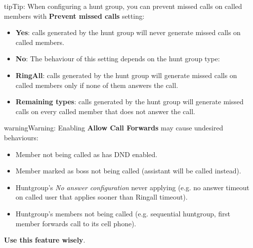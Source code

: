 \documentclass[letterpaper,10pt,english]{sphinxmanual}
\begin{document}
\begin{notice}{tip}{Tip:}
When configuring a hunt group, you can prevent missed calls on called members with \textbf{Prevent missed calls} setting:
\begin{itemize}
\item {} 
\textbf{Yes}: calls generated by the hunt group will never generate missed calls on called members.

\item {} 
\textbf{No}: The behaviour of this setting depends on the hunt group type:

\item {} 
\textbf{RingAll}: calls generated by the hunt group will generate missed calls on called members only if none of them answers the call.

\item {} 
\textbf{Remaining types}: calls generated by the hunt group will generate missed calls on every called member that does not answer the call.

\end{itemize}
\end{notice}

\begin{notice}{warning}{Warning:}
Enabling \textbf{Allow Call Forwards} may cause undesired behaviours:
\begin{itemize}
\item {} 
Member not being called as has DND enabled.

\item {} 
Member marked as boss not being called (assistant will be called instead).

\item {} 
Huntgroup's \emph{No answer configuration} never applying (e.g. no answer timeout on called user that applies sooner than Ringall timeout).

\item {} 
Huntgroup's members not being called (e.g. sequential huntgroup, first member forwards call to its cell phone).

\end{itemize}

\textbf{Use this feature wisely}.
\end{notice}
\end{document}
